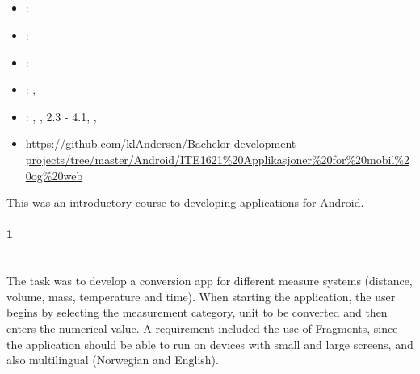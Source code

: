 \subsection[Android course]{}
\label{sec:android_course}
\begin{itemize} 
	\item {}: 
	\item {}: 
	\item {}: 
	\item {}: , 
	\item {}: , ,  2.3 - 4.1, , 
	\item {} \url{https://github.com/klAndersen/Bachelor-development-projects/tree/master/Android/ITE1621%20Applikasjoner%20for%20mobil%20og%20web}
\end{itemize} 
This was an introductory course to developing applications for Android. 

\paragraph{ 1} ~\\
The task was to develop a conversion app for different measure systems (distance, volume, mass, temperature and time).
When starting the application, the user begins by selecting the measurement category, unit to be converted and then enters the numerical value.
A requirement included the use of Fragments, since the application should be able to run on devices with small and large screens, and also multilingual (Norwegian and English).

